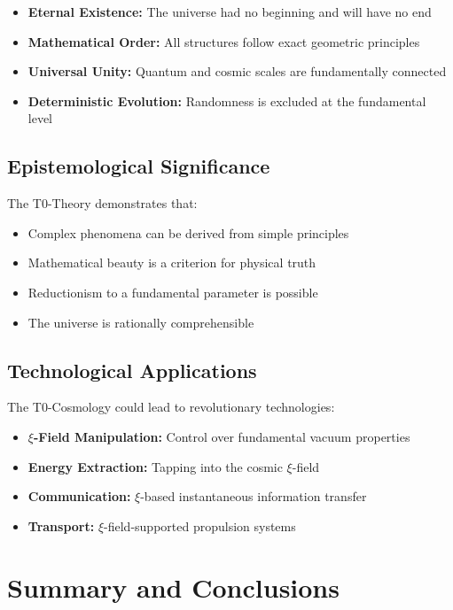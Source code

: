 \documentclass[12pt,a4paper]{article}
\begin{document}
	\begin{itemize}
		\item \textbf{Eternal Existence:} The universe had no beginning and will have no end
		\item \textbf{Mathematical Order:} All structures follow exact geometric principles
		\item \textbf{Universal Unity:} Quantum and cosmic scales are fundamentally connected
		\item \textbf{Deterministic Evolution:} Randomness is excluded at the fundamental level
	\end{itemize}
	
	\subsection{Epistemological Significance}
	
	The T0-Theory demonstrates that:
	
	\begin{itemize}
		\item Complex phenomena can be derived from simple principles
		\item Mathematical beauty is a criterion for physical truth
		\item Reductionism to a fundamental parameter is possible
		\item The universe is rationally comprehensible
	\end{itemize}
	
	
	\subsection{Technological Applications}
	
	The T0-Cosmology could lead to revolutionary technologies:
	
	\begin{itemize}
		\item \textbf{$\xi$-Field Manipulation:} Control over fundamental vacuum properties
		\item \textbf{Energy Extraction:} Tapping into the cosmic $\xi$-field
		\item \textbf{Communication:} $\xi$-based instantaneous information transfer
		\item \textbf{Transport:} $\xi$-field-supported propulsion systems
	\end{itemize}
	
	\section{Summary and Conclusions}
	
\end{document}
